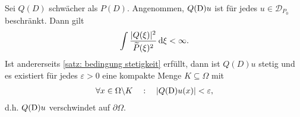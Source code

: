 \begin{thm}
Sei $Q(D)$ schwächer als $P(D)$. Angenommen, $Q(\mathrm D)u$ ist für jedes $u\in\mathcal D_{P_0}$ beschränkt. Dann gilt
\begin{equation}\label{satz: bedingung stetigkeit}
\int \frac{|Q(\xi)|^2}{\widetilde{P}(\xi)^2} \,\mathrm d \xi < \infty.
\end{equation}
Ist andererseits \eqref{satz: bedingung stetigkeit} erfüllt, dann ist $Q(D)u$ stetig und es existiert für jedes $\varepsilon >0$ eine kompakte Menge $K \subseteq \Omega$ mit
\begin{align*}
 \forall x \in \Omega \backslash K\quad:\quad |Q(\mathrm D)u(x)| < \varepsilon,
\end{align*}
d.h. $Q(\mathrm D)u$ verschwindet auf  $\partial\Omega$.
\end{thm}
